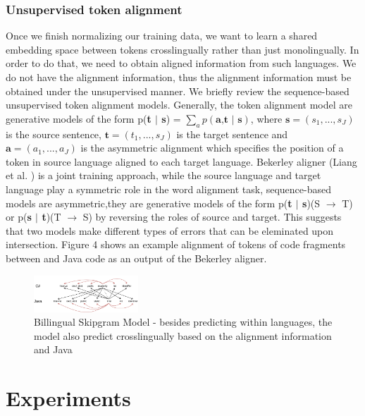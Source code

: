 \subsubsection{ Unsupervised token alignment}

Once we finish normalizing our training data, we want to learn a shared embedding space between tokens crosslingually rather than just monolingually. In order to do that, we need to obtain aligned information from such languages. We do not have the alignment information, thus the alignment information must be obtained under the unsupervised manner. We briefly review the sequence-based unsupervised token alignment models. Generally, the token alignment model are generative models of the form p(\textbf{t $|$ s}) = $\displaystyle\sum_{a} p(\textbf{a,t $|$ s})$, where $\textbf{s} = (s_{1},..., s_{J})$ is the source sentence, $\textbf{t} = (t_{1},..., s_{J})$ is the target sentence and $\textbf{a} = (a_{1},..., a_{J})$ is the asymmetric alignment which specifies the position of a token in source language aligned to each target language. Bekerley aligner (Liang et al. \cite{liang2006alignment}) is a joint training approach, while the source language and target language play a symmetric role in the word alignment task, sequence-based models are asymmetric,they are generative models of the form p(\textbf{t $|$ s})(S $\rightarrow$ T) or p(\textbf{s $|$ t})(T $\rightarrow$ S) by reversing the roles of source and target. This suggests that two models make different types of errors that can be eleminated upon intersection. Figure 4 shows an example alignment of tokens of code fragments between  and Java code as an output of the Bekerley aligner.

\begin{figure}[t!]
	\includegraphics[width=0.35\textwidth]{biskip_align}
	\caption{Billingual Skipgram Model - besides predicting within languages, the model also predict crosslingually based on the alignment information  and Java}
	\label{fig:clf}
\end{figure}

\section{Experiments}


